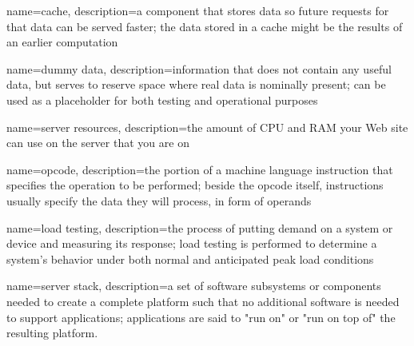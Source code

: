 {
	name={cache},
	description={a component that stores data so future requests for that data can be served faster; the data stored in a cache might be the results of an earlier computation \cite{Wiki:Cache}}
}

{
	name={dummy data},
	description={information that does not contain any useful data, but serves to reserve space where real data is nominally present; can be used as a placeholder for both testing and operational purposes \cite{Wiki:Dummy-data}}
}

{
	name={server resources},
	description={the amount of CPU and RAM your Web site can use on the server that you are on \cite{WebHostingShow:Server-resources}}
}

{
	name={opcode},
	description={the portion of a machine language instruction that specifies the operation to be performed; beside the opcode itself, instructions usually specify the data they will process, in form of operands \cite{Wiki:Opcode}}
}


{
	name={load testing},
	description={the process of putting demand on a system or device and measuring its response; load testing is performed to determine a system’s behavior under both normal and anticipated peak load conditions \cite{Wiki:Load-testing}}
}

{
	name={server stack},
	description={a set of software subsystems or components needed to create a complete platform such that no additional software is needed to support applications; applications are said to "run on" or "run on top of" the resulting platform. \cite{Wiki:Server-stack}}
}
